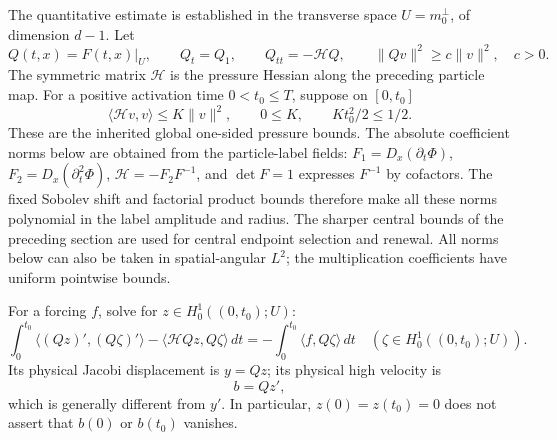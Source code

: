 \documentclass[11pt]{article}
\theoremstyle{definition}
\begin{document}
The quantitative estimate is established in the transverse space
$U=m_0^\perp$, of dimension $d-1$. Let
\[
 Q(t,x)=F(t,x)|_U,\qquad Q_t=Q_1,\qquad
 Q_{tt}=-\mathcal H Q,\qquad
 \|Qv\|^2\geq c\|v\|^2,\quad c>0.
\]
The symmetric matrix $\mathcal H$ is the pressure Hessian along
the preceding particle map. For a positive activation time $0<t_0\leq T$, suppose on $[0,t_0]$
\[
 \langle\mathcal H v,v\rangle\leq K\|v\|^2,\qquad
 0\leq K,\qquad Kt_0^2/2\leq1/2.
\]
These are the inherited global one-sided pressure bounds. The absolute
coefficient norms below are obtained from the particle-label fields:
$F_1=D_x(\partial_t\Phi)$, $F_2=D_x(\partial_t^2\Phi)$,
$\mathcal H=-F_2F^{-1}$, and $\det F=1$ expresses $F^{-1}$ by cofactors.
The fixed Sobolev shift and factorial product bounds therefore make all
these norms polynomial in the label amplitude and radius. The sharper
central bounds of the preceding section are used for central
endpoint selection and renewal. All norms below can also be taken in
spatial-angular $L^2$; the multiplication coefficients have uniform
pointwise bounds.

For a forcing $f$, solve for $z\in H^1_0((0,t_0);U)$:
\begin{equation}\label{eq:joined-history-form}
 \int_0^{t_0}\!
 \big\langle(Qz)',(Q\zeta)'\big\rangle
 -\big\langle\mathcal H Qz,Q\zeta\big\rangle\,dt
 =-\int_0^{t_0}\langle f,Q\zeta\rangle\,dt
 \quad(\zeta\in H^1_0((0,t_0);U)).
\end{equation}
Its physical Jacobi displacement is $y=Qz$; its physical high velocity is
\begin{equation}\label{eq:joined-history-high}
 b=Qz',
\end{equation}
which is generally different from $y'$. In particular, $z(0)=z(t_0)=0$
does not assert that $b(0)$ or $b(t_0)$ vanishes.
\end{document}
